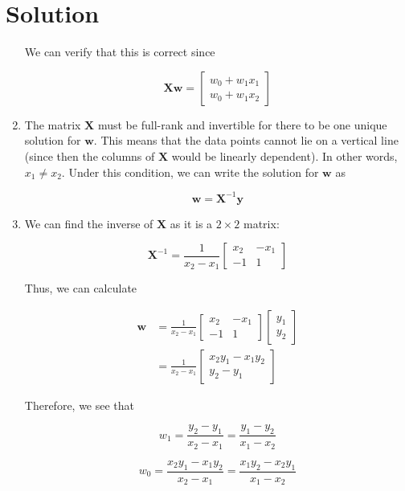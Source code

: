 \documentclass{../harvardml}
\theoremstyle{definition}
\theoremstyle{plain}
\newenvironment{solution}
  {\color{blue}\section*{Solution}}
{}
\begin{document}
\begin{solution}
\begin{enumerate}
        We can verify that this is correct since

        \[
        \mathbf{Xw} =
            \begin{bmatrix}
                w_0 + w_1 x_1 \\
                w_0 + w_1 x_2
            \end{bmatrix}
        \]

        \item The matrix $\bm X$ must be full-rank and invertible for there to be one unique solution for $\bm w$. This means that the data points cannot lie on a vertical line (since then the columns of $\bm X$ would be linearly dependent). In other words, $x_1 \neq x_2$. Under this condition, we can write the solution for $\bm w$ as

        \[
        \bm w = \bm X^{-1}\bm y
        \]

        \item We can find the inverse of $\bm X$ as it is a $2 \times 2$ matrix:

        \[
        \bm X^{-1} = \frac{1}{x_2 - x_1}
        \begin{bmatrix}
            x_2 & -x_1 \\
            -1 & 1
        \end{bmatrix}
        \]

        Thus, we can calculate

        \begin{align*}
            \bm w &= \frac{1}{x_2 - x_1}
        \begin{bmatrix}
            x_2 & -x_1 \\
            -1 & 1
        \end{bmatrix}
        \begin{bmatrix}
            y_1 \\
            y_2
        \end{bmatrix} \\
        &= \frac{1}{x_2 - x_1}
        \begin{bmatrix}
            x_2y_1 - x_1y_2 \\
            y_2 - y_1
        \end{bmatrix}
        \end{align*}

        Therefore, we see that

        \[
        w_1 = \frac{y_2 - y_1}{x_2 - x_1} = \frac{y_1 - y_2}{x_1 - x_2}
        \]

        \[
        w_0 = \frac{x_2y_1 - x_1y_2}{x_2-x_1} = \frac{x_1y_2 - x_2y_1}{x_1 - x_2}
        \]


\end{enumerate}
\end{solution}
\end{document}
